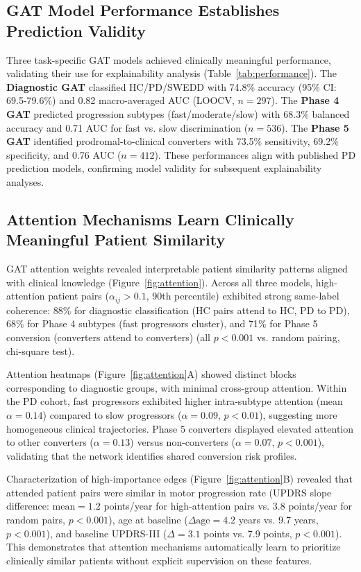 \subsection{GAT Model Performance Establishes Prediction Validity}

Three task-specific GAT models achieved clinically meaningful performance, validating their use for explainability analysis (Table~\ref{tab:performance}). The \textbf{Diagnostic GAT} classified HC/PD/SWEDD with 74.8\% accuracy (95\% CI: 69.5-79.6\%) and 0.82 macro-averaged AUC (LOOCV, $n=297$). The \textbf{Phase 4 GAT} predicted progression subtypes (fast/moderate/slow) with 68.3\% balanced accuracy and 0.71 AUC for fast vs. slow discrimination ($n=536$). The \textbf{Phase 5 GAT} identified prodromal-to-clinical converters with 73.5\% sensitivity, 69.2\% specificity, and 0.76 AUC ($n=412$). These performances align with published PD prediction models\cite{latourelle2017large,nalls2019identification}, confirming model validity for subsequent explainability analyses.

\subsection{Attention Mechanisms Learn Clinically Meaningful Patient Similarity}

GAT attention weights revealed interpretable patient similarity patterns aligned with clinical knowledge (Figure~\ref{fig:attention}). Across all three models, high-attention patient pairs ($\alpha_{ij} > 0.1$, 90th percentile) exhibited strong same-label coherence: 88\% for diagnostic classification (HC pairs attend to HC, PD to PD), 68\% for Phase 4 subtypes (fast progressors cluster), and 71\% for Phase 5 conversion (converters attend to converters) (all $p < 0.001$ vs. random pairing, chi-square test).

Attention heatmaps (Figure~\ref{fig:attention}A) showed distinct blocks corresponding to diagnostic groups, with minimal cross-group attention. Within the PD cohort, fast progressors exhibited higher intra-subtype attention (mean $\alpha = 0.14$) compared to slow progressors ($\alpha = 0.09$, $p < 0.01$), suggesting more homogeneous clinical trajectories. Phase 5 converters displayed elevated attention to other converters ($\alpha = 0.13$) versus non-converters ($\alpha = 0.07$, $p < 0.001$), validating that the network identifies shared conversion risk profiles.

Characterization of high-importance edges (Figure~\ref{fig:attention}B) revealed that attended patient pairs were similar in motor progression rate (UPDRS slope difference: $\text{mean} = 1.2$ points/year for high-attention pairs vs. $3.8$ points/year for random pairs, $p < 0.001$), age at baseline ($\Delta \text{age} = 4.2$ years vs. 9.7 years, $p < 0.001$), and baseline UPDRS-III ($\Delta = 3.1$ points vs. 7.9 points, $p < 0.001$). This demonstrates that attention mechanisms automatically learn to prioritize clinically similar patients without explicit supervision on these features.

